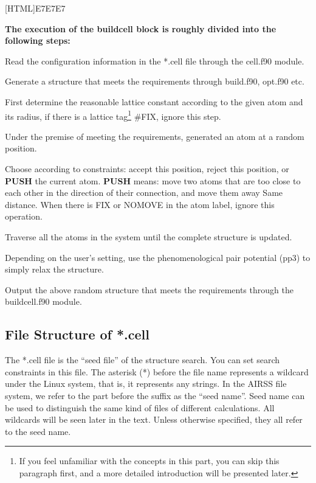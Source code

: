\documentclass[a4paper, 10pt]{article}
\begin{document}
\noindent{}[HTML]{E7E7E7}{\parbox{\textwidth}{%
\noindent \textbf{The execution of the buildcell block is roughly divided into the following steps:}
\begin{maineu}
\item Read the configuration information in the *.cell file through the cell.f90 module.
\item Generate a structure that meets the requirements through build.f90, opt.f90 etc.
  \begin{subeu}
    \item First determine the reasonable lattice constant according to the given atom and its radius, if there is a lattice tag\footnote{If you feel unfamiliar with the concepts in this part, you can skip this paragraph first, and a more detailed introduction will be presented later.} \#FIX, ignore this step.
    \item Under the premise of meeting the requirements, generated an atom at a random position.
    \item Choose according to constraints: accept this position, reject this position, or \textbf{PUSH} the current atom. \textbf{PUSH} means: move two atoms that are too close to each other in the direction of their connection, and move them away Same distance. When there is FIX or NOMOVE in the atom label, ignore this operation.
    \item Traverse all the atoms in the system until the complete structure is updated.
    \item Depending on the user's setting, use the phenomenological pair potential (pp3) to simply relax the structure.
  \end{subeu}
\item Output the above random structure that meets the requirements through the buildcell.f90 module.
\end{maineu}}}

\subsection{File Structure of *.cell}

The *.cell file is the ``seed file'' of the structure search. You can set search constraints in this file. The asterisk (*) before the file name represents a wildcard under the Linux system, that is, it represents any strings. In the AIRSS file system, we refer to the part before the suffix as the ``seed name''. Seed name can be used to distinguish the same kind of files of different calculations. All wildcards will be seen later in the text. Unless otherwise specified, they all refer to the seed name.
\end{document}
